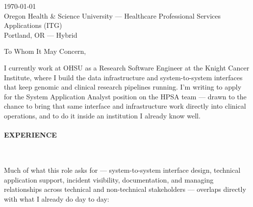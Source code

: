 



\textcolor{my-grey}{\dotfill}
\bigbreak

{\today}\\
Oregon Health \& Science University --- Healthcare Professional Services Applications (ITG)\\
Portland, OR --- Hybrid

\vspace*{1.2\baselineskip}

To Whom It May Concern,

\vspace*{\baselineskip}

I currently work at OHSU as a Research Software Engineer at the Knight Cancer Institute, where I build the data infrastructure and system-to-system interfaces that keep genomic and clinical research pipelines running. I'm writing to apply for the System Application Analyst position on the HPSA team --- drawn to the chance to bring that same interface and infrastructure work directly into clinical operations, and to do it inside an institution I already know well.

\paragraph{EXPERIENCE}\

\vspace*{\baselineskip}

Much of what this role asks for --- system-to-system interface design, technical application support, incident visibility, documentation, and managing relationships across technical and non-technical stakeholders --- overlaps directly with what I already do day to day:


